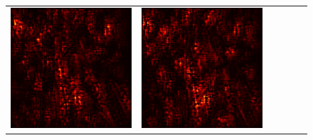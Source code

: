 \documentclass[preprint,12pt]{elsarticle}
\begin{document}
\begin{figure}[p]
\begin{tabular}{cccccc}
  \includegraphics[scale=\scale]{../visualizations/examples/imagenette/cnn/positive_saliency_map/6.png} & 
  \includegraphics[scale=\scale]{../visualizations/examples/imagenette/cnn/negative_saliency_map/6.png} & 

\end{tabular}
\end{figure}
\end{document}

